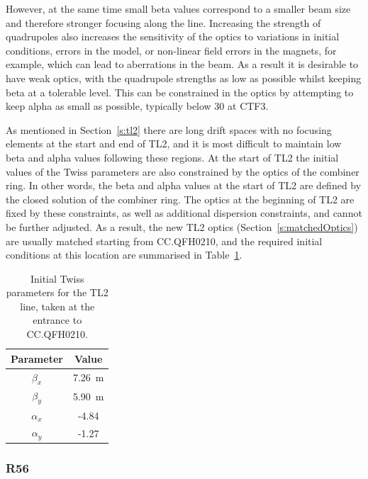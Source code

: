 However, at the same time small beta values correspond to a smaller beam size and therefore stronger focusing along the line. Increasing the strength of quadrupoles also increases the sensitivity of the optics to variations in initial conditions, errors in the model, or non-linear field errors in the magnets, for example, which can lead to aberrations in the beam. As a result it is desirable to have weak optics, with the quadrupole strengths as low as possible whilst keeping beta at a tolerable level. This can be constrained in the optics by attempting to keep alpha as small as possible, typically below 30 at CTF3.

As mentioned in Section~\ref{s:tl2} there are long drift spaces with no focusing elements at the start and end of TL2, and it is most difficult to maintain low beta and alpha values following these regions. At the start of TL2 the initial values of the Twiss parameters are also constrained by the optics of the combiner ring. In other words, the beta and alpha values at the start of TL2 are defined by the closed solution of the combiner ring. The optics at the beginning of TL2 are fixed by these constraints, as well as additional dispersion constraints, and cannot be further adjusted. As a result, the new TL2 optics (Section~\ref{s:matchedOptics}) are usually matched starting from CC.QFH0210, and the required initial conditions at this location are summarised in Table~\ref{t:tl2InitTwiss}.

\begin{table}
  \begin{center}
    \begin{tabular}{|c c|}
	   \hline
       Parameter & Value \\
       \hline
       \(\beta_x\) & 7.26~m\\
	   \(\beta_y\) & 5.90~m\\
	   \(\alpha_x\) & -4.84\\
	   \(\alpha_y\) & -1.27\\
	   \hline
    \end{tabular}
    \caption{Initial Twiss parameters for the TL2 line, taken at the entrance to CC.QFH0210.}
  	\label{t:tl2InitTwiss}
  \end{center}
\end{table}

\subsubsection{R56}

